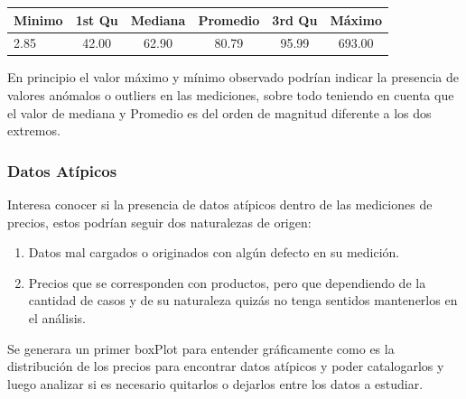 \begin{center}
 \begin{tabular}{||l c c c c c||} 
 \hline
 Minimo & 1st Qu & Mediana & Promedio & 3rd Qu & Máximo \\ [0.5ex] 
 \hline\hline
 2.85 & 42.00 & 62.90 & 80.79 & 95.99 & 693.00 \\ 
 \hline
 \hline
\end{tabular}
\end{center}

En principio el valor máximo y mínimo observado podrían indicar la presencia de valores anómalos o outliers en las mediciones, sobre todo teniendo en cuenta que el valor de mediana y Promedio es del orden de magnitud diferente a los dos extremos.


\subsubsection{Datos Atípicos}

Interesa conocer si la presencia de datos atípicos dentro de las mediciones de precios, estos podrían seguir dos naturalezas de origen:

\begin{enumerate}
    \item Datos mal cargados o originados con algún defecto en su medición.
    \item Precios que se corresponden con productos, pero que dependiendo de la cantidad de casos y de su naturaleza quizás no tenga sentidos mantenerlos en el análisis.
\end{enumerate}


Se generara un primer boxPlot para entender gráficamente como es la distribución de los precios para encontrar datos atípicos y poder catalogarlos y luego analizar si es necesario quitarlos o dejarlos entre los datos a estudiar.



